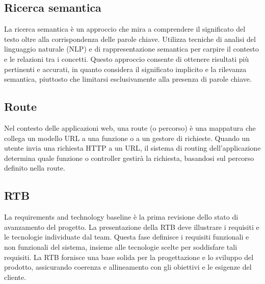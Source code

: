 \vspace{2em}
\subsection*{Ricerca semantica}
\par La ricerca semantica è un approccio che mira a comprendere il significato del testo oltre alla corrispondenza delle parole chiave. Utilizza tecniche di analisi del linguaggio naturale (NLP) e di rappresentazione semantica per carpire il contesto e le relazioni tra i concetti. Questo approccio consente di ottenere risultati più pertinenti e accurati, in quanto considera il significato implicito e la rilevanza semantica, piuttosto che limitarsi esclusivamente alla presenza di parole chiave.

\vspace{2em}
\subsection*{Route}
\par Nel contesto delle applicazioni web, una route (o percorso) è una mappatura che collega un modello URL a una funzione o a un gestore di richieste. Quando un utente invia una richiesta HTTP a un URL, il sistema di routing dell'applicazione determina quale funzione o controller gestirà la richiesta, basandosi sul percorso definito nella route.

\vspace{2em}
\subsection*{RTB}
\par La requirements and technology baseline è la prima revisione dello stato di avanzamento del progetto. La presentazione della RTB deve illustrare i requisiti e le tecnologie individuate dal team. Questa fase definisce i requisiti funzionali e non funzionali del sistema, insieme alle tecnologie scelte per soddisfare tali requisiti. La RTB fornisce una base solida per la progettazione e lo sviluppo del prodotto, assicurando coerenza e allineamento con gli obiettivi e le esigenze del cliente.
